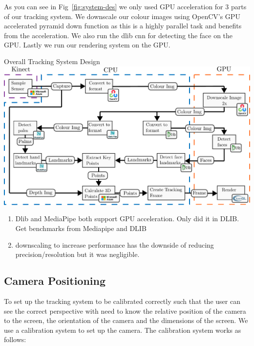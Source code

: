 As you can see in Fig~\ref{fig:system-des} we only used GPU acceleration for 3 parts of our tracking system. We downscale our colour images using OpenCV's GPU accelerated pyramid down function as this is a highly parallel task and benefits from the acceleration. We also run the dlib cnn for detecting the face on the GPU. Lastly we run our rendering system on the GPU.
\begin{figureBox}[label={fig:system-des}, width=1.0\linewidth]{Overall Tracking System Design}
    \includegraphics[width = 1.0w\linewidth]{./implementation/figures/tracking-system.pdf}
\end{figureBox}

\begin{enumerate}[itemsep=-0.25em]
	\item Dlib and MediaPipe both support GPU acceleration. Only did it in DLIB. Get benchmarks from Mediapipe and DLIB
	\item downscaling to increase performance has the downside of reducing precision/resolution but it was negligible.
\end{enumerate}


\subsection{Camera Positioning}

To set up the tracking system to be calibrated correctly such that the user can see the correct perspective with need to know the relative position of the camera to the screen, the orientation of the camera and the dimensions of the screen. We use a calibration system to set up the camera. The calibration system works as follows:

